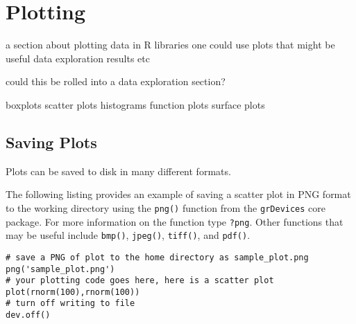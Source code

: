 

\section{Plotting} 
\label{advanced:plotting}

a section about plotting data in R
libraries one could use
plots that might be useful
data exploration
results 
etc

could this be rolled into a data exploration section?


boxplots
scatter plots
histograms
function plots
surface plots

% 
% 
\subsection{Saving Plots}
Plots can be saved to disk in many different formats.

The following listing provides an example of saving a scatter plot in PNG format to the working directory using the \texttt{png()} function from the \texttt{grDevices} core package. For more information on the function type \texttt{?png}. Other functions that may be useful include \texttt{bmp()}, \texttt{jpeg()}, \texttt{tiff()}, and \texttt{pdf()}.

\begin{lstlisting}
# save a PNG of plot to the home directory as sample_plot.png
png('sample_plot.png')
# your plotting code goes here, here is a scatter plot
plot(rnorm(100),rnorm(100))
# turn off writing to file
dev.off()
\end{lstlisting}


